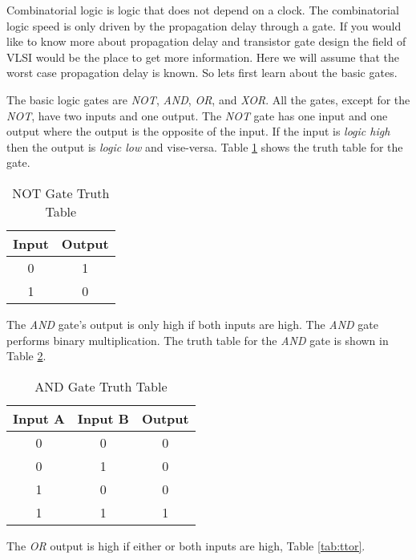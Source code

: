 Combinatorial logic is logic that does not depend on a clock. The combinatorial logic speed is only driven by the propagation delay through a gate. If you would like to know more about propagation delay and transistor gate design the field of \ac{VLSI} would be the place to get more information. Here we will assume that the worst case propagation delay is known. So lets first learn about the basic gates.
	
The basic logic gates are \emph{NOT}, \emph{AND}, \emph{OR}, and \emph{XOR}. All the gates, except for the \emph{NOT}, have two inputs and one output. The \emph{NOT} gate has one input and one output where the output is the opposite of the input. If the input is \emph{logic high} then the output is \emph{logic low} and vise-versa. Table \ref{tab:ttnot} shows the truth table for the gate.
	
\begin{table}[h!]  
\begin{center}    
\caption{NOT Gate Truth Table} 
\label{tab:ttnot} 
\begin{tabular}{|c|c|}  
\textbf{Input} & \textbf{Output}\\  
\hline  
0 & 1\\  
1 & 0\\ 
\end{tabular}  
\end{center}
\end{table}

The \emph{AND} gate's output is only high if both inputs are high. The \emph{AND} gate performs binary multiplication. The truth table for the \emph{AND} gate is shown in Table \ref{tab:ttand}.

\begin{table}[h!]  
\begin{center}    
\caption{AND Gate Truth Table} 
\label{tab:ttand} \begin{tabular}{|c|c|c|}  
\textbf{Input A} & \textbf{Input B} & \textbf{Output}\\  
\hline  
0 & 0 & 0\\  
0 & 1 & 0\\  
1 & 0 & 0\\  
1 & 1 & 1\\ 
\end{tabular}  
\end{center}
\end{table}

The \emph{OR} output is high if either or both inputs are high, Table \ref{tab:ttor}.

